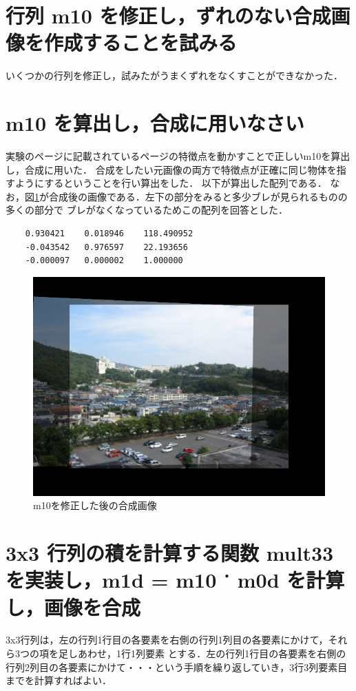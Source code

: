 \documentclass[11pt]{jarticle}
\begin{document}
\section{行列 m10 を修正し，ずれのない合成画像を作成することを試みる}
いくつかの行列を修正し，試みたがうまくずれをなくすことができなかった．

\section{m10 を算出し，合成に用いなさい}
実験のページに記載されているページの特徴点を動かすことで正しいm10を算出し，合成に用いた．
合成をしたい元画像の両方で特徴点が正確に同じ物体を指すようにするということを行い算出をした．
以下が算出した配列である．
なお，図\ref{sansyutu}が合成後の画像である．左下の部分をみると多少ブレが見られるものの多くの部分で
ブレがなくなっているためこの配列を回答とした．
\begin{verbatim}
    0.930421    0.018946    118.490952
    -0.043542   0.976597    22.193656
    -0.000097   0.000002    1.000000 
\end{verbatim}
\begin{figure}[h]
    \centering
    \includegraphics[scale=.5]{sansyutu.png}
    \caption{m10を修正した後の合成画像}
    \label{sansyutu}
\end{figure}

\section{3x3 行列の積を計算する関数 mult33 を実装し，m1d = m10 ˙ m0d を計算し，画像を合成}
3x3行列は，左の行列1行目の各要素を右側の行列1列目の各要素にかけて，それら3つの項を足しあわせ，1行1列要素
とする．左の行列1行目の各要素を右側の行列2列目の各要素にかけて・・・という手順を繰り返していき，3行3列要素目までを計算すればよい．
\end{document}
